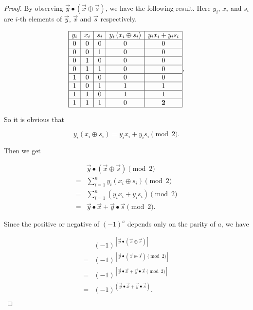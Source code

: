 \begin{proof}
By observing $\vec{y} \bullet(\vec{x} \oplus \vec{s})$, we have the following result. Here $y_i$, $x_i$ and $s_i$ are $i$-th elements of $\vec{y}$, $\vec{x}$ and $\vec{s}$ respectively.

$$
\begin{array}{|c|c|c|c|c|}
\hline y_i & x_i & s_i & y_i\left(x_i \oplus s_i\right) & y_i x_i+y_i s_i\\
\hline 0 & 0 & 0 & 0 & 0 \\
\hline 0 & 0 & 1 & 0 & 0 \\
\hline 0 & 1 & 0 & 0 & 0 \\
\hline 0 & 1 & 1 & 0 & 0 \\
\hline 1 & 0 & 0 & 0 & 0 \\
\hline 1 & 0 & 1 & 1 & 1 \\
\hline 1 & 1 & 0 & 1 & 1 \\
\hline 1 & 1 & 1 & 0 & \textbf{2} \\
\hline
\end{array},
$$

So it is obvious that

$$
y_i\left(x_i \oplus s_i\right) = y_ix_i + y_is_i \pmod{2}.
$$

Then we get

$$
\begin{aligned}
&  \vec{y} \bullet (\vec{x} \oplus \vec{s}) \pmod{2}\\
= & \sum_{i=1}^n y_i \left(x_i \oplus s_i\right) \pmod{2} \\
= & \sum_{i=1}^n\left(y_i x_i+y_i s_i\right) \pmod{2} \\
= & \vec{y} \bullet \vec{x}+\vec{y} \bullet \vec{s} \pmod{2}.
\end{aligned}
$$

Since the positive or negative of $(-1)^a$ depends only on the parity of $a$, we have

$$
\begin{aligned}
& (-1)^{[\vec{y} \bullet (\vec{x} \oplus \vec{s})]} \\
= & (-1)^{[\vec{y} \bullet (\vec{x} \oplus \vec{s}) \pmod{2}]} \\
= & (-1)^{[\vec{y} \bullet \vec{x}+\vec{y} \bullet \vec{s} \pmod{2}]} \\
= & (-1)^{(\vec{y} \bullet \vec{x}+\vec{y} \bullet \vec{s})}. \\
\end{aligned}
$$
\end{proof}

